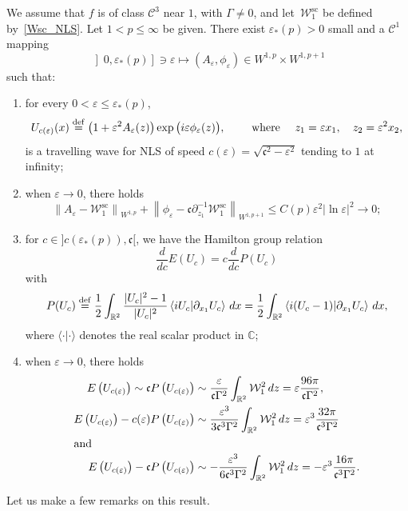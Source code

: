 \documentclass[AHL,Unicode,longabstracts,published]{cedram}
\newcommand*\p{\partial}
\newcommand*\R{\mathbb R}
\newcommand*\C{\mathbb C}
\newcommand*\ddef{\stackrel{\rm def}{=}}
\renewcommand{\sc}{\mathrm{sc}}
\newcommand*\BC{\mathcal{C}}
\newcommand*\BW{\mathcal{W}}
\newcommand*\cs{{\mathfrak c}}
\newcommand*\ii{\infty}
\newcommand*\ls{\leqslant }
\newcommand*\e{\varepsilon}
\newcommand*\lne{\lvert \ln \varepsilon \rvert}
\newcommand*{\romanenumi}{\renewcommand*{\theenumi}{\roman{enumi}}}
\begin{document}
\begin{theo}\label{mainTH}
We assume that $f$ is of class $ \BC^3 $ near $1 $, with $ \Gamma \neq 0 $, and let~$ \BW_1^{\sc} $ be defined by~\eqref{Wsc_NLS}. Let $ 1 < p \ls \ii $ be given. There exist $ \e_* (p) > 0 $ small and a $ \BC^1 $ mapping
\[
\left] 0, \e_*(p)\right] \ni \e \mapsto (A_\e, \phi_\e) \in W^{1,p} \times W^{1,p+1}
\]
such that:
\begin{enumerate}\romanenumi
\item\label{theo1.3.1} for every $ 0 < \e \ls \e_*(p) $,
\[
U_{c(\e)} (x) \ddef \big(1 + \e^2 A_\e (z) \big) \exp \big(i \e \phi_\e (z) \big),
\qquad \text{ where } \quad z_1 = \e x_1, \quad z_2 = \e^2 x_2,
\]
is a travelling wave for NLS of speed $ c(\e) = \sqrt{ \cs^2 - \e^2 } $ tending to $1$ at infinity;

\item\label{theo1.3.2} when $ \e \to 0 $, there holds
\[
\left\| A_\e - \BW_1^{\sc} \right\|_{ W^{1,p} } + \left\| \phi_\e - \cs \p_{z_1}^{-1} \BW_1^{\sc} \right\|_{ W^{1,p+1} }
\ls C(p) \e^2 \lne^2 \to 0 ;
\]
\item\label{theo1.3.3} for $ c \in] c(\e_*(p)), \cs [$, we have the Hamilton group relation
\[
\frac{d}{dc} E(U_c) = c \frac{d}{dc} P(U_c)
\]
with
\[
P(U_c) \ddef \frac{1}{2} \int_{\R^2} \frac{ \lvert U_c \rvert^2 - 1 }{ \lvert U_c \rvert^2 } \left\langle i U_c | \p_{x_1} U_c \right\rangle \, dx = \frac{1}{2} \int_{\R^2} \left\langle i (U_c - 1) \middle| \p_{x_1} U_c \right\rangle \, dx,
\]
where $ \langle \cdot | \cdot \rangle $ denotes the real scalar product in $ \C $;

\item\label{theo1.3.4} when $ \e \to 0 $, there holds
\begin{align*}
E\left(U_{c(\e)}\right) \sim \cs P \left(U_{c(\e)}\right) &\sim \frac{\e}{\cs \Gamma^2} \int_{\R^2} \BW_1^2 \, dz = \e \frac{96 \pi}{\cs \Gamma^2},
\\
E\left(U_{c(\e)}\right) - c(\e) P \left(U_{c(\e)}\right)
&\sim \frac{\e^3}{3 \cs^3 \Gamma^2} \int_{\R^2} \BW_1^2 \, dz = \e^3 \frac{32\pi}{\cs^3 \Gamma^2}
\\
\intertext{and}
E\left(U_{c(\e)}\right) - \cs P \left(U_{c(\e)}\right)
&\sim - \frac{\e^3}{6 \cs^3 \Gamma^2} \int_{\R^2} \BW_1^2 \, dz = - \e^3 \frac{16 \pi}{\cs^3 \Gamma^2}.
\end{align*}
\end{enumerate}
\end{theo}


Let us make a few remarks on this result.
\end{document}

